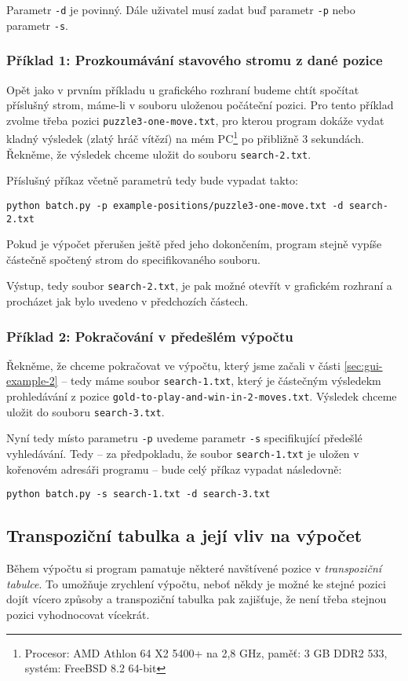\documentclass{article}
\begin{document}
Parametr \texttt{-d} je povinný. Dále uživatel musí zadat buď parametr \texttt{-p} nebo parametr \texttt{-s}.

\subsubsection{Příklad 1: Prozkoumávání stavového stromu z dané pozice}
Opět jako v prvním příkladu u grafického rozhraní budeme chtít spočítat příslušný strom, máme-li v souboru uloženou
počáteční pozici. Pro tento příklad zvolme třeba pozici \texttt{puzzle3-one-move.txt}, pro kterou program dokáže vydat
kladný výsledek (zlatý hráč vítězí) na mém PC\footnote{Procesor: AMD Athlon 64 X2 5400+ na 2,8 GHz, paměť: 3 GB DDR2 533,
systém: FreeBSD 8.2 64-bit}  po přibližně 3 sekundách. Řekněme, že výsledek chceme uložit do souboru
\texttt{search-2.txt}.

Příslušný příkaz včetně parametrů tedy bude vypadat takto:
\begin{center}\verb+python batch.py -p example-positions/puzzle3-one-move.txt -d search-2.txt+\end{center}

Pokud je výpočet přerušen ještě před jeho dokončením, program stejně vypíše částečně spočtený strom do specifikovaného
souboru.

Výstup, tedy soubor \texttt{search-2.txt}, je pak možné otevřít v grafickém rozhraní a procházet jak bylo uvedeno v
předchozích částech.

\subsubsection{Příklad 2: Pokračování v předešlém výpočtu}
Řekněme, že chceme pokračovat ve výpočtu, který jsme začali v části \ref{sec:gui-example-2} -- tedy máme soubor
\texttt{search-1.txt}, který je částečným výsledekm prohledávání z pozice \texttt{gold-to-play-and-win-in-2-moves.txt}.
Výsledek chceme uložit do souboru \texttt{search-3.txt}.

Nyní tedy místo parametru \texttt{-p} uvedeme parametr \texttt{-s} specifikující předešlé vyhledávání. Tedy -- za
předpokladu, že soubor \texttt{search-1.txt} je uložen v kořenovém adresáři programu -- bude celý příkaz vypadat
následovně:
\begin{center}\verb+python batch.py -s search-1.txt -d search-3.txt+\end{center}

\subsection{Transpoziční tabulka a její vliv na výpočet}
Během výpočtu si program pamatuje některé navštívené pozice v \emph{transpoziční tabulce}. To umožňuje zrychlení
výpočtu, neboť někdy je možné ke stejné pozici dojít vícero způsoby a transpoziční tabulka pak zajišťuje, že není třeba
stejnou pozici vyhodnocovat vícekrát.
\end{document}
